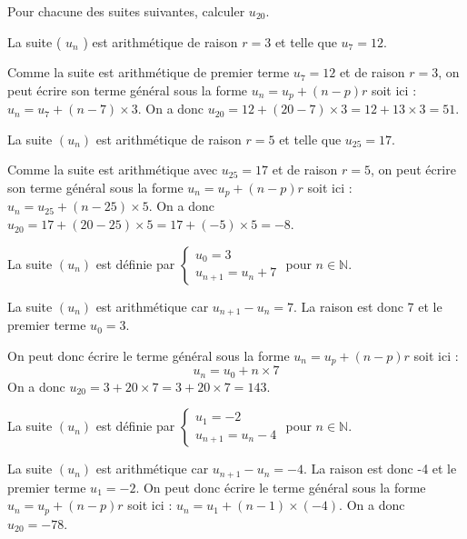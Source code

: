 \documentclass[11pt,a4paper]{article}  %
\begin{document}

Pour chacune des suites suivantes, calculer $u_{20}$.
\begin{enumMet}
	\item La suite ( $u_n$ ) est arithmétique de raison $r=3$ et telle que $u_7=12$.
	\begin{corrBox}
		Comme la suite est arithmétique de premier terme $u_7=12$ et de raison $r=3$, on peut écrire son terme général sous la forme $u_n=u_p+(n-p) r$ soit ici : $u_n=u_7+(n-7) \times 3$.
		On a donc $u_{20}=12+(20-7) \times 3=12+13 \times 3=51$.
	\end{corrBox}
	\item La suite $\left(u_n\right)$ est arithmétique de raison $r=5$ et telle que $u_{25}=17$.
	\begin{corrBox}
		Comme la suite est arithmétique avec $u_{25}=17$ et de raison $r=5$, on peut écrire son terme général sous la forme $u_n=u_p+(n-p) r$ soit ici : $u_n=u_{25}+(n-25) \times 5$.
		On a donc $u_{20}=17+(20-25) \times 5=17+(-5) \times 5=-8$.		
	\end{corrBox}
	\item La suite $\left(u_n\right)$ est définie par $\left\{\begin{array}{l}u_0=3 \\ u_{n+1}=u_n+7\end{array}\right.$ pour $n \in \mathbb{N}$.
	\begin{corrBox}
		La suite $\left(u_n\right)$ est arithmétique car $u_{n+1}-u_n=7$. La raison est donc 7 et le premier terme $u_0=3$.
		
		On peut donc écrire le terme général sous la forme $u_n=u_p+(n-p) r$ soit ici :
		$$
		u_n=u_0+n \times 7
		$$
		On a donc $u_{20}=3+20 \times 7=3+20 \times 7=143$.			
	\end{corrBox}
	\item La suite $\left(u_n\right)$ est définie par $\left\{\begin{array}{l}u_1=-2 \\ u_{n+1}=u_n-4\end{array}\right.$ pour $n \in \mathbb{N}$.
	\begin{corrBox}
		La suite $\left(u_n\right)$ est arithmétique car $u_{n+1}-u_n=-4$. La raison est donc -4 et le premier terme $u_1=-2$. On peut donc écrire le terme général sous la forme $u_n=u_p+(n-p) r$ soit ici : $u_n=u_1+(n-1) \times(-4)$. On a donc $u_{20}=-78$.			
	\end{corrBox}
\end{enumMet}
\end{document}

